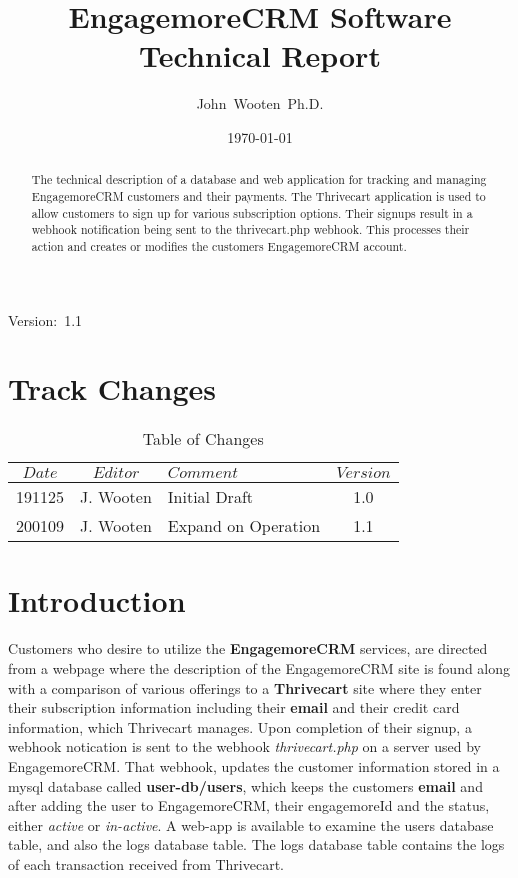 \documentclass[final,letterpaper,12pt]{article}
\author{John~Wooten~Ph.D.\\
}
\date{\today \\
}
\title{EngagemoreCRM Software Technical Report		}
\begin{document}
\maketitle
\begin{center}
Version:~1.1
\end{center}

\begin {abstract}
\noindent The technical description of a database and web application
for tracking and managing EngagemoreCRM customers and their payments.
The Thrivecart application is used to allow customers to sign up for various
subscription options.  Their signups result in a webhook notification being sent to
the thrivecart.php webhook.  This processes their action and creates or modifies
the customers EngagemoreCRM account.
\end{abstract}
\newpage
\tableofcontents
\newpage
\listoffigures
\listoftables

\newpage
\section{Track Changes}
\begin{table}[h]
\begin{center}
\begin{tabular}{|c|c|l|c|} \hline
$ Date $ & $Editor$ & $Comment$ & $Version$ \\
\hline
191125 & J. Wooten & Initial Draft & 1.0  \\
200109 & J. Wooten & Expand on Operation & 1.1 \\

\hline
\end{tabular}
\end{center}
\caption {Table of Changes}
\label{tab:cqdata0}
\end{table}

\newpage
\section{Introduction}
\noindent Customers who desire to utilize the {\bf EngagemoreCRM} services, are directed from a webpage
where the description of the EngagemoreCRM site is found along with a comparison of various offerings
to a {\bf Thrivecart} site where they enter their subscription information including their {\bf email} and their credit card information, which Thrivecart manages.
Upon completion of their signup, a webhook notication is sent to the webhook {\it thrivecart.php} on
a server used by EngagemoreCRM.  That webhook, updates the customer information stored in a mysql
database called {\bf user-db/users}, which keeps the customers {\bf email} and after adding the user to EngagemoreCRM,
their engagemoreId and the status, either {\it active} or {\it in-active}.  A web-app is available to examine the users database table, and also
the logs database table. The logs database table contains the logs of each transaction received
from Thrivecart.
\end{document}
